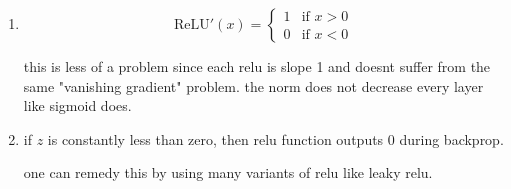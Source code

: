 \documentclass{report}
\begin{document}
\begin{enumerate}
    \item $$\text{ReLU}'(x) = \begin{cases} 1 & \text{if } x > 0 \\ 0 & \text{if } x < 0 \end{cases}$$
    
    this is less of a problem since each relu is slope 1 and doesnt suffer from the same "vanishing gradient" problem. the norm does not decrease every layer like sigmoid does. 
    \item if \(z\) is constantly less than zero, then relu function outputs 0 during backprop. 
    
    one can remedy this by using many variants of relu like leaky relu. 


\end{enumerate}
\end{document}
